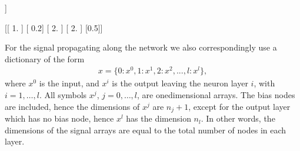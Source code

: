 \documentclass[letterpaper,10pt,english]{jupyterBook}
\begin{document}
\begin{sphinxVerbatim}[commandchars=\\\{\}]
\PYG{p}{[}\PYG{p}{[}\PYG{p}{]}\PYG{p}{[}\PYG{p}{]}\PYG{p}{[}\PYG{p}{]}\PYG{p}{]}\PYG{p}{[}\PYG{p}{[}\PYG{p}{]}\PYG{p}{[}\PYG{p}{]}\PYG{p}{[}\PYG{p}{]}\PYG{p}{[}\PYG{p}{]}\PYG{p}{[}\PYG{p}{]}\PYG{p}{]}

\PYG{p}{[}\PYG{p}{]}
\PYG{p}{[}\PYG{p}{]}
\end{sphinxVerbatim}

\begin{sphinxVerbatim}[commandchars=\\\{\}]
[[ 1.   2.   1.   1. ]
 [ 2.  \PYGZhy{}3.   0.2  2. ]
 [\PYGZhy{}3.  \PYGZhy{}3.   5.   7. ]]

[[ 1. ]
 [ 0.2]
 [ 2. ]
 [ 2. ]
 [\PYGZhy{}0.5]]
\end{sphinxVerbatim}

\sphinxAtStartPar
For the signal propagating along the network we also correspondingly use a dictionary of the form
\begin{equation*}
\begin{split}x=\{0: x^0, 1: x^1, 2: x^2, ..., l: x^l\},\end{split}
\end{equation*}
\sphinxAtStartPar
where \(x^0\) is the input, and \(x^i\) is the output leaving the neuron layer \(i\), with \(i=1, \dots, l\). All symbols \(x^j\), \(j=0, \dots, l\), are one\sphinxhyphen{}dimensional arrays. The bias nodes are included, hence the dimensions of \(x^j\) are \(n_j+1\), except for the output layer which has no bias node, hence \(x^l\) has the dimension \(n_l\). In other words, the dimensions of the signal arrays are equal to the total number of nodes in each layer.
\end{document}
